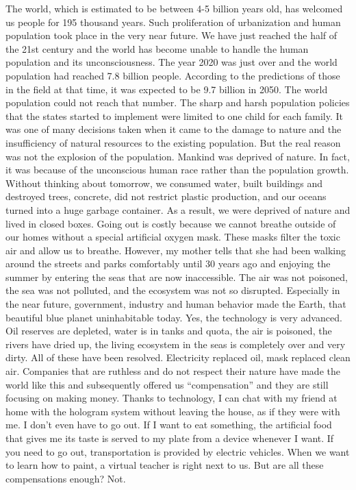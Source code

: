 \documentclass[]{book}
\begin{document}
The world, which is estimated to be between 4-5 billion years old, has welcomed us people for 195 thousand years. Such proliferation of urbanization and human population took place in the very near future. We have just reached the half of the 21st century and the world has become unable to handle the human population and its unconsciousness. The year 2020 was just over and the world population had reached 7.8 billion people. According to the predictions of those in the field at that time, it was expected to be 9.7 billion in 2050. The world population could not reach that number. The sharp and harsh population policies that the states started to implement were limited to one child for each family. It was one of many decisions taken when it came to the damage to nature and the insufficiency of natural resources to the existing population. But the real reason was not the explosion of the population. Mankind was deprived of nature. In fact, it was because of the unconscious human race rather than the population growth. Without thinking about tomorrow, we consumed water, built buildings and destroyed trees, concrete, did not restrict plastic production, and our oceans turned into a huge garbage container. As a result, we were deprived of nature and lived in closed boxes. Going out is costly because we cannot breathe outside of our homes without a special artificial oxygen mask. These masks filter the toxic air and allow us to breathe. However, my mother tells that she had been walking around the streets and parks comfortably until 30 years ago and enjoying the summer by entering the seas that are now inaccessible. The air was not poisoned, the sea was not polluted, and the ecosystem was not so disrupted. Especially in the near future, government, industry and human behavior made the Earth, that beautiful blue planet uninhabitable today. Yes, the technology is very advanced. Oil reserves are depleted, water is in tanks and quota, the air is poisoned, the rivers have dried up, the living ecosystem in the seas is completely over and very dirty. All of these have been resolved. Electricity replaced oil, mask replaced clean air. Companies that are ruthless and do not respect their nature have made the world like this and subsequently offered us ``compensation'' and they are still focusing on making money. Thanks to technology, I can chat with my friend at home with the hologram system without leaving the house, as if they were with me. I don't even have to go out. If I want to eat something, the artificial food that gives me its taste is served to my plate from a device whenever I want. If you need to go out, transportation is provided by electric vehicles. When we want to learn how to paint, a virtual teacher is right next to us.
But are all these compensations enough? Not.
\end{document}
